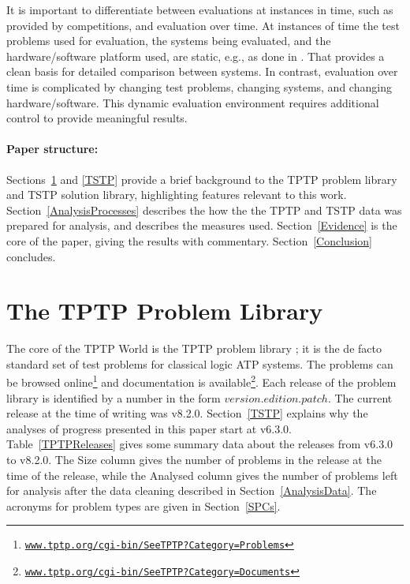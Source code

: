 \documentclass[runningheads]{llncs}
\begin{document}
It is important to differentiate between evaluations at instances in time, such as provided by
competitions, and evaluation over time.
At instances of time the test problems used for evaluation, the systems being evaluated, and
the hardware/software platform used, are static, e.g., as done in \cite{CSW15}.
That provides a clean basis for detailed comparison between systems.
In contrast, evaluation over time is complicated by changing test problems, changing systems,
and changing hardware/software.
This dynamic evaluation environment requires additional control to provide meaningful results.

\paragraph{Paper structure:}
Sections~\ref{TPTP} and \ref{TSTP} provide a brief background to the TPTP problem library and
TSTP solution library, highlighting features relevant to this work.
Section~\ref{AnalysisProcesses} describes the how the the TPTP and TSTP data was prepared for
analysis, and describes the measures used.
Section~\ref{Evidence} is the core of the paper, giving the results with commentary.
Section~\ref{Conclusion} concludes.

\section{The TPTP Problem Library}
\label{TPTP}

The core of the TPTP World is the TPTP problem library \cite{Sut09}; it is the de facto standard 
set of test problems for classical logic ATP systems.
The problems can be browsed online\footnote{%
\href{https://www.tptp.org/cgi-bin/SeeTPTP?Category=Problems}
{\tt www.tptp.org/cgi-bin/SeeTPTP?Category=Problems}}
and documentation is available\footnote{%
\href{https://www.tptp.org/cgi-bin/SeeTPTP?Category=Documents}
{\tt www.tptp.org/cgi-bin/SeeTPTP?Category=Documents}}.
Each release of the problem library is identified by a number in the form 
$version$.$edition$.$patch$.
The current release at the time of writing was v8.2.0.
Section~\ref{TSTP} explains why the analyses of progress presented in this paper start at v6.3.0.
Table~\ref{TPTPReleases} gives some summary data about the releases from v6.3.0 to v8.2.0.
The Size column gives the number of problems in the release at the time of the release, while
the Analysed column gives the number of problems left for analysis after the data cleaning 
described in Section~\ref{AnalysisData}.
The acronyms for problem types are given in Section~\ref{SPCs}.
\end{document}
